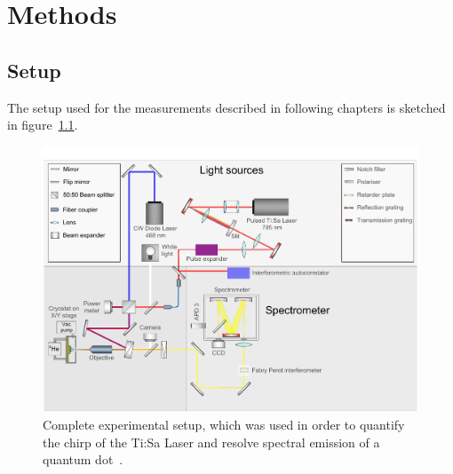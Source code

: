 \chapter{Methods}

\section{Setup}

The setup used for the measurements described in following chapters is sketched in figure~\ref{fig:setupflat}.

\begin{figure}[H]
	\centering
	\includegraphics[width=\linewidth]{figures/setup/Setup_flat}
	\caption[Complete experimental setup]{Complete experimental setup, which was used in order to quantify the chirp of the Ti:Sa Laser and resolve spectral emission of a quantum dot~\cite{schimpf_towards_2017}.}
	\label{fig:setupflat}
\end{figure}